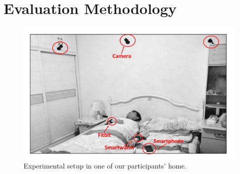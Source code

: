 \section{Evaluation Methodology}
\label{sec:expsetup}







\begin{figure}[!t]
	\centering
	\includegraphics[width=0.75\linewidth]{Figures/setup.pdf}
	\caption{Experimental setup in one of our participants' home. }\label{fig:setup}
\end{figure}



